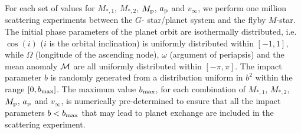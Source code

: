 \documentclass[twocolumn]{aastex62}
\begin{document}
For each set of values for $M_{*,1}$, $M_{*,2}$, $M_{\rm p}$, $a_{\rm p}$ and $v_\infty$, we perform 
one million scattering experiments between the $G$- star/planet system and the flyby $M$-star. The initial phase parameters of the planet orbit are isothermally distributed, i.e. $\cos(i)$ 
($i$ is the orbital inclination)
is uniformly distributed within $[-1,1]$, while $\Omega$ (longitude of the ascending node), $\omega$ (argument of periapsis) and 
 the mean anomaly $\cal{M}$ 
are all uniformly distributed within $[-\pi, \pi]$.
 The impact parameter $b$ is randomly generated from a distribution uniform in
 $b^2$  within the range $[0, b_{\rm max}]$. The maximum value $b_{\rm max}$, for each combination of  $M_{*,1}$, $M_{*,2}$, $M_{\rm p}$, $a_{\rm p}$ and $v_\infty$, is numerically pre-determined to ensure that all the impact parameters $b<b_{\rm max}$ that may lead to planet exchange are included in the scattering experiment.  
\end{document}
